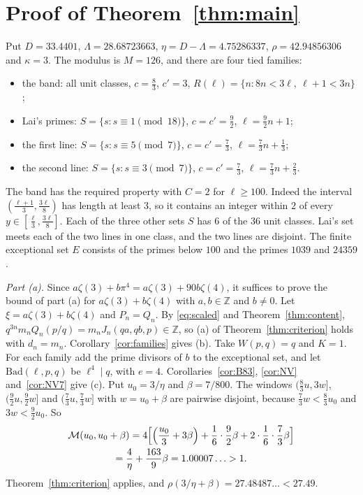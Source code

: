 \documentclass[11pt]{amsart}
\theoremstyle{definition}
\theoremstyle{remark}
\numberwithin{equation}{section}
\newcommand{\Z}{\mathbb Z}
\newcommand{\cM}{\mathcal M}
\begin{document}
\section{Proof of Theorem~\ref{thm:main}}\label{sec:proof}

Put $D=33.4401$, $\Lambda=28.68723663$, $\eta=D-\Lambda=4.75286337$, $\rho=42.94856306$ and $\kappa=3$. The modulus is
$M=126$, and there are four tied families:
\begin{itemize}
\item the band: all unit classes, $c=\frac83$, $c'=3$, $R(\ell)=\{n:8n<3\ell,\ \ell+1<3n\}$;
\item Lai's primes: $S=\{s:s\equiv1\pmod{18}\}$, $c=c'=\frac92$, $\ell=\frac92n+1$;
\item the first line: $S=\{s:s\equiv5\pmod7\}$, $c=c'=\frac73$, $\ell=\frac73n+\frac13$;
\item the second line: $S=\{s:s\equiv3\pmod7\}$, $c=c'=\frac73$, $\ell=\frac73n+\frac23$.
\end{itemize}
The band has the required property with $C=2$ for $\ell\ge100$. Indeed the interval $(\frac{\ell+1}3,\frac{3\ell}8)$
has length at least $3$, so it contains an integer within $2$ of every $y\in[\frac\ell3,\frac{3\ell}8]$. Each of the
three other sets $S$ has $6$ of the $36$ unit classes. Lai's set meets each of the two lines in one class, and the
two lines are disjoint. The finite exceptional set $E$ consists of the primes below $100$ and the primes $1039$ and
$24359$.

\emph{Part (a).} Since $a\zeta(3)+b\pi^4=a\zeta(3)+90b\zeta(4)$, it suffices to prove the bound of part (a) for
$a\zeta(3)+b\zeta(4)$ with $a,b\in\Z$ and $b\ne0$. Let $\xi=a\zeta(3)+b\zeta(4)$ and $P_n=Q_n$. By \eqref{eq:scaled} and
Theorem~\ref{thm:content}, $q^{3n}m_nQ_n(p/q)=m_nJ_n(qa,qb,p)\in\Z$, so (a) of Theorem~\ref{thm:criterion} holds with
$d_n=m_n$. Corollary~\ref{cor:families} gives (b). Take $W(p,q)=q$ and $K=1$. For each family add the prime divisors of
$b$ to the exceptional set, and let $\mathrm{Bad}(\ell,p,q)$ be $\ell^4\mid q$, with $e=4$. Corollaries~\ref{cor:B83},
\ref{cor:NV} and~\ref{cor:NV7} give (c). Put $u_0=3/\eta$ and $\beta=7/800$. The windows $(\frac83u,3w]$, $(\frac92u,\frac92w]$ and
$(\frac73u,\frac73w]$ with $w=u_0+\beta$ are pairwise disjoint, because $\frac73w<\frac83u_0$ and $3w<\frac92u_0$. So
\begin{multline*}
 \cM(u_0,u_0+\beta)=4\Bigl[\Bigl(\frac{u_0}3+3\beta\Bigr)+\frac16\cdot\frac92\beta+2\cdot\frac16\cdot\frac73\beta\Bigr]\\
 =\frac4\eta+\frac{163}9\beta=1.00007\ldots>1 .
\end{multline*}
Theorem~\ref{thm:criterion} applies, and $\rho(3/\eta+\beta)=27.48487\ldots<27.49$.
\end{document}
